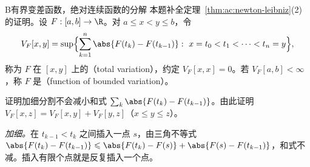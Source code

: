 \begin{probleme}{B}{有界变差函数，绝对连续函数的分解}
本题补全定理~\ref{thm:ac:newton-leibniz}(2) 的证明。设 $F:[a,b]\to\R$。对 $a\leqslant x<y\leqslant b$，令
\[
V_F[x,y]=\sup\Bigl\{\sum_{k=1}^n\abs{F(t_k)-F(t_{k-1})}:\ x=t_0<t_1<\cdots<t_n=y\Bigr\},
\]
称为 $F$ 在 $[x,y]$ 上的（total variation），约定 $V_F[x,x]=0$。若 $V_F[a,b]<\infty$，称 $F$ 是（function of bounded variation）。
\begin{questions}
\item 证明加细分割不会减小和式 $\sum_k\abs{F(t_k)-F(t_{k-1})}$。由此证明 $V_F[x,z]=V_F[x,y]+V_F[y,z]$（$x\leqslant y\leqslant z$）。
\begin{solution}
\emph{加细。}在 $t_{k-1}<t_k$ 之间插入一点 $s$，由三角不等式 $\abs{F(t_k)-F(t_{k-1})}\leqslant\abs{F(t_k)-F(s)}+\abs{F(s)-F(t_{k-1})}$，和式不减。插入有限个点就是反复插入一个点。


\end{solution}
\end{questions}
\end{probleme}
